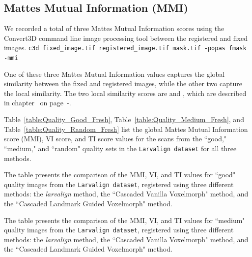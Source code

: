 \documentclass{book}
\begin{document}

	\subsection{Mattes Mutual Information (MMI)}
	We recorded a total of three Mattes Mutual Information \cite{mattes} scores using the Convert3D command line image processing tool between the registered and fixed images. \newline
	\verb|c3d fixed_image.tif registered_image.tif mask.tif -popas fmask -mmi|
	
	One of these three Mattes Mutual Information values captures the global similarity between the fixed and registered images, while the other two capture the local similarity. The two local similarity scores are  and , which are described in chapter~ on page~\pageref{subsubsec:vi}-\pageref{subsubsec:ti}.
	
	Table~\ref{table:Quality_Good_Fresh}, Table~\ref{table:Quality_Medium_Fresh}, and Table~\ref{table:Quality_Random_Fresh} list the global Mattes Mutual Information score (MMI), VI score, and TI score values for the scans from the ``good," ``medium," and ``random" quality sets in the \texttt{Larvalign dataset} for all three methods.

	\begin{table}[h!]
		\centering
		
		\caption{The table presents the comparison of the MMI, VI, and TI values for ``good" quality images from the \texttt{Larvalign dataset}, registered using three different methods: the \textit{larvalign} method, the ``Cascaded Vanilla Voxelmorph" method, and the ``Cascaded Landmark Guided Voxelmorph" method.}
		\label{table:Quality_Good_Fresh}
	\end{table}

	\begin{table}[h!]
		\centering
		
		\caption{The table presents the comparison of the MMI, VI, and TI values for ``medium" quality images from the \texttt{Larvalign dataset}, registered using three different methods: the \textit{larvalign} method, the ``Cascaded Vanilla Voxelmorph" method, and the ``Cascaded Landmark Guided Voxelmorph" method.}
		\label{table:Quality_Medium_Fresh}
	\end{table}
\end{document}
